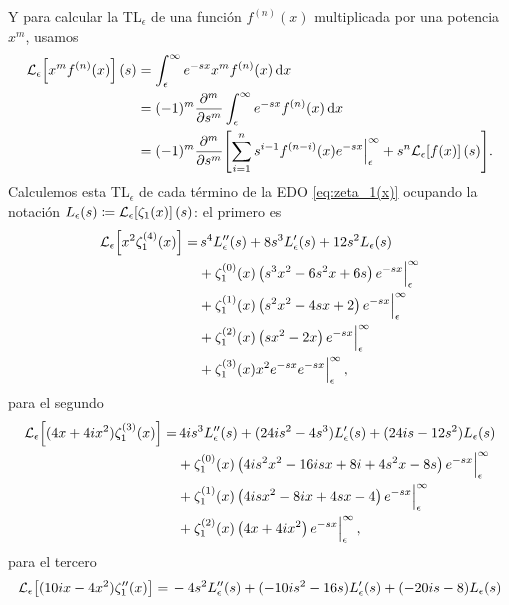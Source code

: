 \documentclass[%
 aip,
 jmp,%
 amsmath,amssymb,
 reprint,%
]{revtex4-2}
\begin{document}
{Y para calcular la TL$_\epsilon$ de una función $f^{(n)}(x)$ multiplicada por una potencia $x^m$, usamos
\begin{equation}
    \begin{aligned}
        \mathcal{L}_\epsilon\qty[x^mf^{(n)}(x)](s)&=\int_\epsilon^\infty e^{-sx}x^mf^{(n)}(x)\dd{x}\\
        &=(-1)^m\pdv[m]{s}\int_\epsilon^\infty e^{-sx}f^{(n)}(x)\dd{x}\\
        &=(-1)^m\pdv[m]{s}\qty[\sum_{i=1}^n s^{i-1}f^{(n-i)}(x)e^{-sx}\Big|_\epsilon^\infty + s^n\mathcal{L}_\epsilon\qty[f(x)](s)].
    \end{aligned}
\end{equation}
Calculemos esta TL$_\epsilon$ de cada término de la EDO \eqref{eq:zeta_1(x)} ocupando la notación $L_\epsilon(s)\coloneq\mathcal{L}_\epsilon\qty[\zeta_1(x)](s)$: el primero es
\begin{equation}
    \begin{aligned}
        \mathcal{L}_\epsilon\qty[x^2\zeta_1^{(4)}(x)]=&\,s^4 L_\epsilon''(s)+8 s^3 L_\epsilon'(s)+12 s^2 L_\epsilon(s)\\
        &+\zeta^{(0)}_1(x) \left(s^3 x^2-6 s^2 x+6 s\right)e^{-sx}\Big|_\epsilon^\infty\\
        &+\zeta^{(1)}_1(x) \left(s^2 x^2-4 s x+2\right)e^{-sx}\Big|_\epsilon^\infty\\
        &+\zeta^{(2)}_1(x) \left(s x^2-2 x\right)e^{-sx}\Big|_\epsilon^\infty\\
        &+\zeta^{(3)}_1(x) x^2 e^{-s x}e^{-sx}\Big|_\epsilon^\infty\,,
    \end{aligned}
\end{equation}
para el segundo
\begin{equation}
    \begin{aligned}
        \mathcal{L}_\epsilon\qty[(4x+4ix^2)\zeta_1^{(3)}(x)]=&\, 4 i s^3 L_\epsilon''(s) + (24 i s^2 - 4 s^3)L_\epsilon'(s) + (24 i s-12 s^2)L_\epsilon(s)\\
        &+\zeta^{(0)}_1(x)\left(4is^2x^2-16isx+8i +4 s^2 x  -8 s  \right)e^{-sx}\Big|_\epsilon^\infty\\
        &+\zeta^{(1)}_1(x) \left(4isx^2-8ix  +4 s x  -4  \right)e^{-sx}\Big|_\epsilon^\infty\\
        &+\zeta^{(2)}_1(x) \left(4 x  +4 i x^2  \right)e^{-sx}\Big|_\epsilon^\infty\,,
    \end{aligned}
\end{equation}
para el tercero
\begin{equation}
    \begin{aligned}
        \Le\qty[(10ix-4x^2)\z_1''(x)]=&\, -4 s^2 L_\epsilon''(s) + (-10 i s^2-16 s)L_\epsilon'(s) + (-20is-8)L_\epsilon(s)\\

\end{aligned}
\end{equation}}
\end{document}
